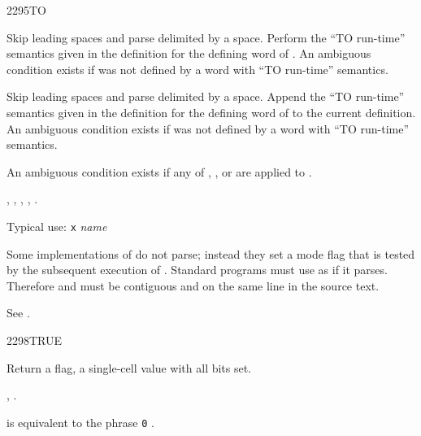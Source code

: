 \enlargethispage{4ex}
\begin{worddef}{2295}{TO}
\interpret

	Skip leading spaces and parse  delimited by a space.
	Perform the ``TO  run-time'' semantics given in the
	definition for the defining word of .
	An ambiguous condition exists if  was not defined
	by a word with ``TO  run-time'' semantics.

\compile

	Skip leading spaces and parse  delimited by a
	space. Append the ``TO  run-time'' semantics given
	in the definition for the defining word	of  to the
	current definition.
	An ambiguous condition exists if  was not defined
	by a word with ``TO  run-time'' semantics.

\note
	An ambiguous condition exists if any of	,
	\word{[COMPILE]},  or \word{[']} are applied to
	.

\see {},
	,
	,
	,
	.

	\begin{rationale} %
		Typical use: \texttt{x}  \emph{name}

		Some implementations of  do not parse; instead they set
		a mode flag that is tested by the subsequent execution of
		.  Standard programs must use  as if it
		parses.  Therefore  and  must be
		contiguous and on the same line in the source text.
	\end{rationale}

	\begin{testing} %
		See .
	\end{testing}
\end{worddef}


\begin{worddef}{2298}{TRUE}
\item {}

	Return a  flag, a single-cell value with all
	bits set.

\see {},
	.

	\begin{rationale} %
		 is equivalent to the phrase
		\texttt{0} .
	\end{rationale}

	\begin{testing}
	 \\
	 \\
	\end{testing}
\end{worddef}


